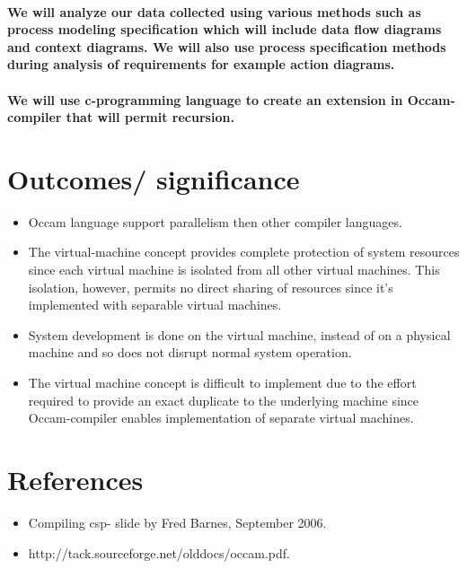 \documentclass[dvips,12pt]{article}
\begin{document}
	\paragraph{We will analyze our data collected using various methods such as process modeling specification which will include data flow diagrams and context diagrams. We will also use process specification methods during analysis of requirements for example action diagrams.}
\paragraph{We will use c-programming language to create an extension in Occam-compiler that will permit recursion.}
  
	
	\section{Outcomes/ significance}

	\begin{itemize}
	\item 
	Occam language support parallelism then other compiler languages.
	\item
	The virtual-machine concept provides complete protection of system resources since each virtual machine is isolated from all other virtual machines.  This isolation, however, permits no direct sharing of resources since it’s implemented with separable virtual machines.
	\item
	System development is done on the virtual machine, instead of on a physical machine and so does not disrupt normal system operation.
	\item
	The virtual machine concept is difficult to implement due to the effort required to provide an exact duplicate to the underlying machine since Occam-compiler enables implementation of separate virtual machines.
	\end{itemize}
	
	\section{References}
	
	\begin{itemize}
	\item 
	Compiling csp- slide by Fred Barnes, September 2006.
	\item
	http://tack.sourceforge.net/olddocs/occam.pdf.
	\end{itemize}
	
\end{document}

